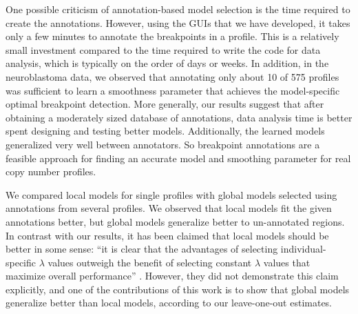\documentclass[10pt]{bmc_article}
\newenvironment{bmcformat}{\begin{raggedright}\baselineskip20pt\sloppy\setboolean{publ}{false}}{\end{raggedright}\baselineskip20pt\sloppy}
\begin{document}
\begin{bmcformat}
One possible criticism of annotation-based model selection is the time
required to create the annotations. However, using the GUIs that we
have developed, it takes only a few minutes to annotate the
breakpoints in a profile. This is a relatively small investment
compared to the time required to write the code for data analysis,
which is typically on the order of days or weeks. In addition, in the
neuroblastoma data, we observed that annotating only about 10 of 575
profiles was sufficient to learn a smoothness parameter that achieves
the model-specific optimal breakpoint detection. More generally, our
results suggest that after obtaining a moderately sized database of
annotations, data analysis time is better spent designing and testing
better models. Additionally, the learned models generalized very well
between annotators. So breakpoint annotations are a feasible approach
for finding an accurate model and smoothing parameter for real copy
number profiles.




We compared local models for single profiles with global models
selected using annotations from several profiles. We observed that
local models fit the given annotations better, but global models
generalize better to un-annotated regions. In contrast with our
results, it has been claimed that local models should be better in
some sense: ``it is clear that the advantages of selecting
individual-specific $\lambda$ values outweigh the benefit of selecting
constant $\lambda$ values that maximize overall performance''
\cite{penalized-cna}.  However, they did not demonstrate this claim
explicitly, and one of the contributions of this work is to show that
global models generalize better than local models, according to our
leave-one-out estimates. 






\end{bmcformat}
\end{document}
